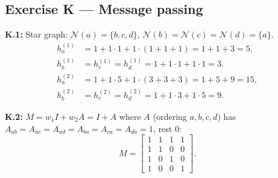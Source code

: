 \documentclass[12pt,a4paper]{article}
\begin{document}
\subsection*{Exercise K --- Message passing}

\textbf{K.1:} Star graph: $\mathcal{N}(a)=\{b,c,d\}$, $\mathcal{N}(b)=\mathcal{N}(c)=\mathcal{N}(d)=\{a\}$.
\begin{align*}
  h_a^{(1)}&=1+1\cdot 1+1\cdot(1+1+1)=1+1+3=5,\\
  h_b^{(1)}&=h_c^{(1)}=h_d^{(1)}=1+1\cdot 1+1\cdot 1=3.\\[4pt]
  h_a^{(2)}&=1+1\cdot 5+1\cdot(3+3+3)=1+5+9=\boxed{15},\\
  h_b^{(2)}&=h_c^{(2)}=h_d^{(2)}=1+1\cdot 3+1\cdot 5=\boxed{9}.
\end{align*}

\textbf{K.2:} $M=w_1 I+w_2 A=I+A$ where $A$ (ordering $a,b,c,d$) has $A_{ab}=A_{ac}=A_{ad}=A_{ba}=A_{ca}=A_{da}=1$, rest 0:
\[
  M=\begin{bmatrix}1&1&1&1\\1&1&0&0\\1&0&1&0\\1&0&0&1\end{bmatrix}.
\]
\end{document}

